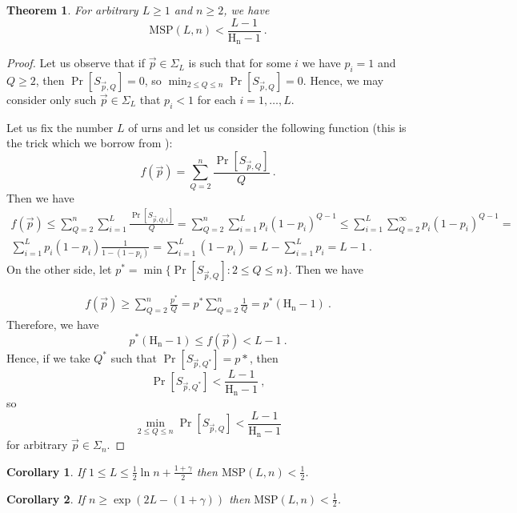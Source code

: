 \documentclass[proceedings]{dmtcs}
\newtheorem{theorem}{Theorem}
\newtheorem{corollary}{Corollary}
\newcommand{\HarmonicN}[1]{\mathrm{H_{#1}}}
\newcommand{\MSP}[2]{\mathrm{MSP}\left(#1,#2\right)}
\begin{document}
\begin{theorem}
\label{thm:main}
For arbitrary $L\geq 1$ and $n \geq 2$, we have
$$\MSP{L}{n} < \frac{L-1}{\HarmonicN{n} -1}~.$$
\end{theorem}

\begin{proof}
Let us observe that if $\vec{p}\in\Sigma_L$ is such that for some $i$ we have $p_i = 1$ and $Q\geq 2$, then
$\Pr[S_{\vec{p},Q}]=0$, so  $\min_{2\leq Q \leq n} \Pr[S_{\vec{p},Q}] = 0$. Hence, we may consider only
such $\vec{p}\in\Sigma_L$ that $p_i<1$ for each $i=1,\ldots,L$.
 
Let us fix  the number $L$ of urns and let us consider the following function (this is the trick which we borrow from
\cite{Willard:1986}):
$$
  f(\vec{p}) = \sum_{Q=2}^{n} \frac{\Pr[S_{\vec{p},Q}]}{Q}~. 
$$
Then we have
\begin{gather*}
	f(\vec{p}) \leq \sum_{Q=2}^{n} \sum_{i=1}^{L}\frac{\Pr[S_{\vec{p},Q,i}]}{Q} =  
                \sum_{Q=2}^{n} \sum_{i=1}^{L}p_i (1-p_i)^{Q-1} \leq 
								\sum_{i=1}^{L} \sum_{Q=2}^{\infty} p_i (1-p_i)^{Q-1} = \\
	\sum_{i=1}^{L} p_i (1-p_i) \frac{1}{1-(1-p_i)} = \sum_{i=1}^{L} (1-p_i) = 
	L - \sum_{i=1}^{L} p_i = L-1~. 	
\end{gather*}
On the other side, let $p^* = \min\{\Pr[S_{\vec{p},Q}]: 2\leq Q \leq n\}$. Then we have

\begin{gather*}
	f(\vec{p}) \geq \sum_{Q=2}^{n} \frac{p^*}{Q} = 
                  p^* \sum_{Q=2}^{n} \frac{1}{Q}  = p^* (\HarmonicN{n} - 1)~. 	
\end{gather*}
Therefore, we have
$$
  p^* (\HarmonicN{n} - 1) \leq f(\vec{p}) < L-1~.
$$
Hence, if we take $Q^*$ such that $\Pr[S_{\vec{p},Q^*}] = p*$, then
$$
  \Pr[S_{\vec{p},Q^*}] <\frac{L-1}{\HarmonicN{n}-1}~,
$$
so 
$$
  \min_{2\leq Q \leq n} \Pr[S_{\vec{p},Q}] < \frac{L-1}{\HarmonicN{n}-1}
$$
for arbitrary $\vec{p} \in \Sigma_n$.  
\end{proof}


\begin{corollary}
\label{cor:bound01}
If $1 \leq L\leq  \frac12 \ln n + \frac{1+\gamma}{2}$ then   $\MSP{L}{n} < \frac12$.
\end{corollary}

\begin{corollary}
\label{cor:bound02}
If $n \geq \exp(2 L - (1+\gamma))$  then   $\MSP{L}{n} < \frac12$.
\end{corollary}
\end{document}
